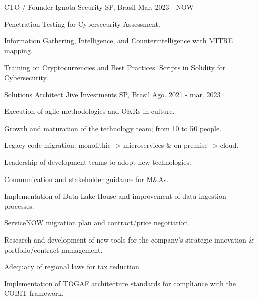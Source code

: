 

\begin{cventries}


    \cventry
   {CTO / Founder } %
   {Ignota Security} %
   {SP, Brasil} %
   {Mar. 2023 - NOW} %
   {
   	\begin{cvitems} %
   		\item {Penetration Testing for Cybersecurity Assessment.}
   		\item {Information Gathering, Intelligence, and Counterintelligence with MITRE mapping.}
   		\item {Training on Cryptocurrencies and Best Practices. Scripts in Solidity for Cybersecurity.}   		
   	\end{cvitems}
   }   	
   	\cventry
	{Solutions Architect} %
	{Jive Investments} %
	{SP, Brasil} %
	{Ago. 2021 - mar. 2023} %
	{
		\begin{cvitems} %
			\item {Execution of agile methodologies and OKRs in culture.}
			\item {Growth and maturation of the technology team; from 10 to 50 people.}
			\item {Legacy code migration: monolithic -> microservices \& on-premise -> cloud.}
			\item {Leadership of development teams to adopt new technologies.}			
			\item {Communication and stakeholder guidance for M\&As.}			
			\item {Implementation of Data-Lake-House and improvement of data ingestion processes.}
			\item {ServiceNOW migration plan and contract/price negotiation.}
			\item {Research and development of new tools for the company's strategic innovation \& portfolio/contract management. }
			\item {Adequacy of regional laws for tax reduction.}			
			\item {Implementation of TOGAF architecture standards for compliance with the COBIT framework.}

\end{cvitems}}
\end{cventries}
